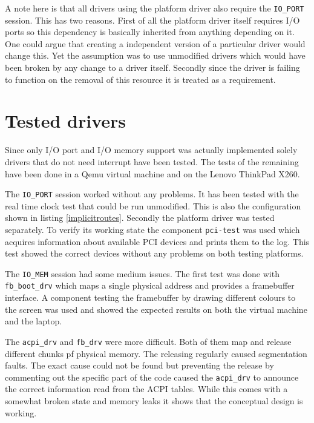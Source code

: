 \documentclass[
a4paper,
12pt,
notitlepage,
parskip=half,
DIV=11,
]{scrbook}
\begin{document}
			
		A note here is that all drivers using the platform driver also require the \texttt{IO\_PORT} session.
		This has two reasons.
		First of all the platform driver itself requires I/O ports so this dependency is basically inherited from anything depending on it.
		One could argue that creating a independent version of a particular driver would change this.
		Yet the assumption was to use unmodified drivers which would have been broken by any change to a driver itself.
		Secondly since the driver is failing to function on the removal of this resource it is treated as a requirement.
		
		\section{Tested drivers}
		
		Since only I/O port and I/O memory support was actually implemented solely drivers that do not need interrupt have been tested.
		The tests of the remaining have been done in a Qemu virtual machine and on the Lenovo ThinkPad X260.
		
		The \texttt{IO\_PORT} session worked without any problems.
		It has been tested with the real time clock test that could be run unmodified.
		This is also the configuration shown in listing \ref{implicitroutes}.
		Secondly the platform driver was tested separately.
		To verify its working state the component \texttt{pci-test} was used which acquires information about available PCI devices and prints them to the log.
		This test showed the correct devices without any problems on both testing platforms.
		
		The \texttt{IO\_MEM} session had some medium issues.
		The first test was done with \texttt{fb\_boot\_drv} which maps a single physical address and provides a framebuffer interface.
		A component testing the framebuffer by drawing different colours to the screen was used and showed the expected results on both the virtual machine and the laptop.
		
		The \texttt{acpi\_drv} and \texttt{fb\_drv} were more difficult.
		Both of them map and release different chunks pf physical memory.
		The releasing regularly caused segmentation faults.
		The exact cause could not be found but preventing the release by commenting out the specific part of the code caused the \texttt{acpi\_drv} to announce the correct information read from the ACPI tables.
		While this comes with a somewhat broken state and memory leaks it shows that the conceptual design is working.
		
\end{document}
